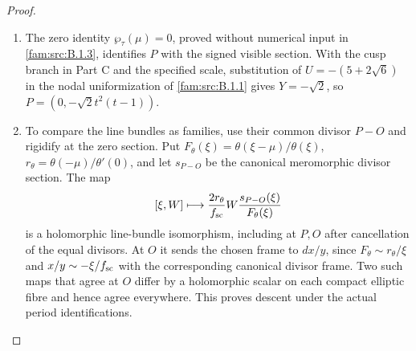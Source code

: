 \begin{proof}
\begin{enumerate}[label=\arabic*.,leftmargin=*]
\item The zero identity $\wp_\tau(\mu)=0$, proved without numerical input in \ref{fam:src:B.1.3}, identifies $P$ with the signed visible section. With the cusp branch in Part C and the specified scale, substitution of $U=-(5+2\sqrt6)$ in the nodal uniformization of \ref{fam:src:B.1.1} gives $Y=-\sqrt2$, so $P=(0,-\sqrt2t^2(t-1))$.

\item To compare the line bundles as families, use their common divisor $P-O$ and rigidify at the zero section. Put $F_\theta(\xi)=\theta(\xi-\mu)/\theta(\xi)$, $r_\theta=\theta(-\mu)/\theta'(0)$, and let $s_{P-O}$ be the canonical meromorphic divisor section. The map
\[
 [\xi,W]\longmapsto\frac{2r_\theta}{f_{\rm sc}}
        W\frac{s_{P-O}(\xi)}{F_\theta(\xi)}
\]
is a holomorphic line-bundle isomorphism, including at $P,O$ after cancellation of the equal divisors. At $O$ it sends the chosen frame to $dx/y$, since $F_\theta\sim r_\theta/\xi$ and $x/y\sim-\xi/f_{\rm sc}$ with the corresponding canonical divisor frame. Two such maps that agree at $O$ differ by a holomorphic scalar on each compact elliptic fibre and hence agree everywhere. This proves descent under the actual period identifications.


\end{enumerate}
\end{proof}
